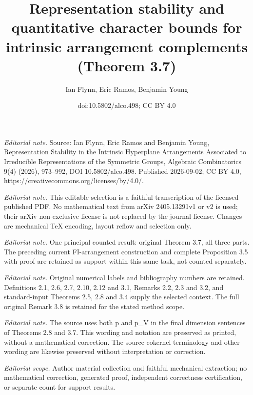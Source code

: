 \documentclass[10pt,a4paper]{article}
\title{Representation stability and quantitative character bounds for intrinsic arrangement complements (Theorem 3.7)}
\author{Ian Flynn, Eric Ramos, Benjamin Young}
\date{doi:10.5802/alco.498; CC BY 4.0}
\begin{document}
\maketitle
\noindent\textit{Editorial note.} Source: Ian Flynn, Eric Ramos and Benjamin Young, Representation Stability in the Intrinsic Hyperplane Arrangements Associated to Irreducible Representations of the Symmetric Groups, Algebraic Combinatorics 9(4) (2026), 973–992, DOI 10.5802/alco.498. Published 2026-09-02; CC BY 4.0, https://creativecommons.org/licenses/by/4.0/.\par\medskip
\noindent\textit{Editorial note.} This editable selection is a faithful transcription of the licensed published PDF. No mathematical text from arXiv 2405.13291v1 or v2 is used; their arXiv non-exclusive license is not replaced by the journal license. Changes are mechanical TeX encoding, layout reflow and selection only.\par\medskip
\noindent\textit{Editorial note.} One principal counted result: original Theorem 3.7, all three parts. The preceding current FI-arrangement construction and complete Proposition 3.5 with proof are retained as support within this same task, not counted separately.\par\medskip
\noindent\textit{Editorial note.} Original numerical labels and bibliography numbers are retained. Definitions 2.1, 2.6, 2.7, 2.10, 2.12 and 3.1, Remarks 2.2, 2.3 and 3.2, and standard-input Theorems 2.5, 2.8 and 3.4 supply the selected context. The full original Remark 3.8 is retained for the stated method scope.\par\medskip
\noindent\textit{Editorial note.} The source uses both p and p\_V in the final dimension sentences of Theorems 2.8 and 3.7. This wording and notation are preserved as printed, without a mathematical correction. The source cokernel terminology and other wording are likewise preserved without interpretation or correction.\par\medskip
\noindent\textit{Editorial scope.} Author material collection and faithful mechanical extraction; no mathematical correction, generated proof, independent correctness certification, or separate count for support results.\par\medskip
\end{document}
